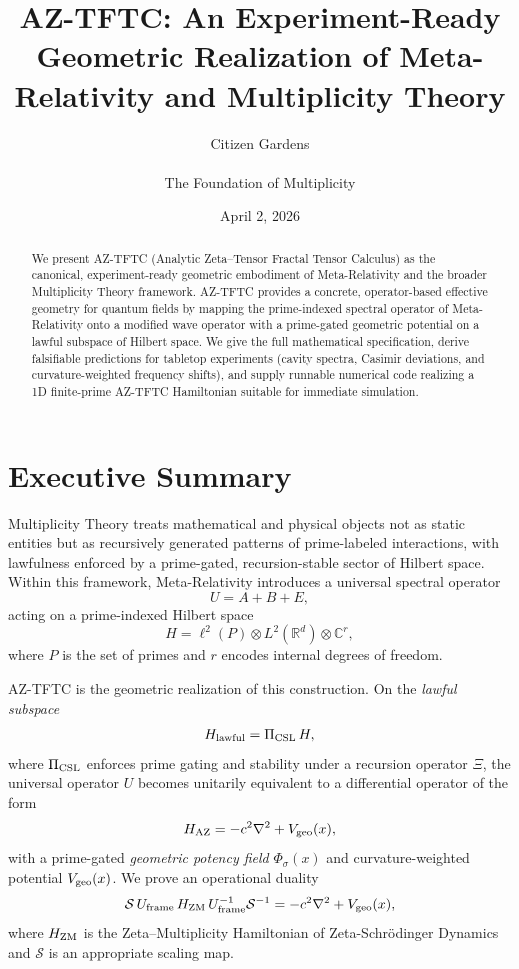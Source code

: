 \documentclass[11pt]{article}
\title{AZ-TFTC: An Experiment-Ready Geometric Realization of Meta-Relativity and Multiplicity Theory}
\author{Citizen Gardens \\ \\ The Foundation of Multiplicity}
\date{April 2, 2026}
\begin{document}
\maketitle

\begin{abstract}
We present AZ-TFTC (Analytic Zeta--Tensor Fractal Tensor Calculus) as the canonical, experiment-ready geometric embodiment of Meta-Relativity and the broader Multiplicity Theory framework.
AZ-TFTC provides a concrete, operator-based effective geometry for quantum fields by mapping the prime-indexed spectral operator of Meta-Relativity onto a modified wave operator with a prime-gated geometric potential on a lawful subspace of Hilbert space.
We give the full mathematical specification, derive falsifiable predictions for tabletop experiments (cavity spectra, Casimir deviations, and curvature-weighted frequency shifts), and supply runnable numerical code realizing a 1D finite-prime AZ-TFTC Hamiltonian suitable for immediate simulation.
\end{abstract}

\tableofcontents

\section{Executive Summary}

Multiplicity Theory treats mathematical and physical objects not as static entities but as recursively generated patterns of prime-labeled interactions, with lawfulness enforced by a prime-gated, recursion-stable sector of Hilbert space.\cite{MetaRel,MultiplicityBohmian}
Within this framework, Meta-Relativity introduces a universal spectral operator
\begin{equation}
U = A + B + E,
\end{equation}
acting on a prime-indexed Hilbert space
\begin{equation}
H = \ell^2(P) \otimes L^2(\mathbb{R}^d) \otimes \mathbb{C}^r,
\end{equation}
where $P$ is the set of primes and $r$ encodes internal degrees of freedom.\cite{ZSD,CEQG}

AZ-TFTC is the geometric realization of this construction.
On the \emph{lawful subspace}
\begin{equation}
H_{\rm lawful} = \Pi_{\rm CSL}\,H,
\end{equation}
where $\Pi_{\rm CSL}$ enforces prime gating and stability under a recursion operator $\Xi$, the universal operator $U$ becomes unitarily equivalent to a differential operator of the form
\begin{equation}
H_{\rm AZ} = -c^2 \nabla^2 + V_{\rm geo}(x),
\end{equation}
with a prime-gated \emph{geometric potency field} $\Phi_\sigma(x)$ and curvature-weighted potential $V_{\rm geo}(x)$.
We prove an operational duality
\begin{equation}
\mathcal{S}\,U_{\rm frame}\,H_{\rm ZM}\,U_{\rm frame}^{-1}\mathcal{S}^{-1}
= -c^2\nabla^2 + V_{\rm geo}(x),
\end{equation}
where $H_{\rm ZM}$ is the Zeta--Multiplicity Hamiltonian of Zeta-Schrödinger Dynamics and $\mathcal{S}$ is an appropriate scaling map.\cite{ZSD}
\end{document}
